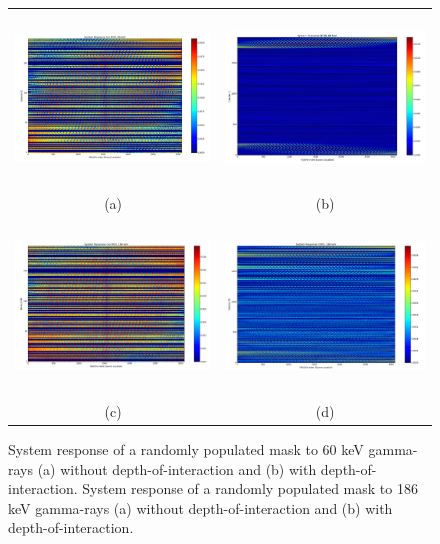\documentclass[10pt]{article}
\begin{document}
\begin{figure}[htb!]
\hypertarget{fig3}{}
\centering
\begin{tabular}{cc}
	\includegraphics[height=130pt]{Figures/SystemResponse_60_noDOI.png} & 
	\includegraphics[height=130pt]{Figures/SystemResponse_60_DOI.png} \\ [-0.5ex]
	\scriptsize{(a)} & \scriptsize{(b)} \\ [1ex]
	\includegraphics[height=130pt]{Figures/SystemResponse_186_noDOI.png} & 
	\includegraphics[height=130pt]{Figures/SystemResponse_186_DOI.png} \\ [-0.5ex]
	\scriptsize{(c)} & \scriptsize{(d)} \\[-5pt]
\end{tabular}
\caption{System response of a randomly populated mask to 60 keV gamma-rays (a) without depth-of-interaction and (b) with depth-of-interaction. System response of a randomly populated mask to 186 keV gamma-rays (a) without depth-of-interaction and (b) with depth-of-interaction.}
\end{figure}
\end{document}
